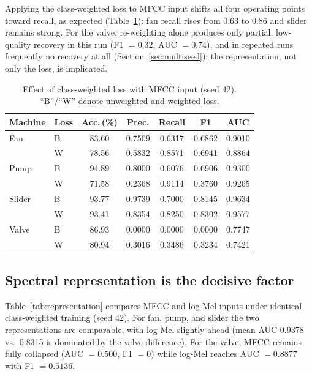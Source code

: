 \documentclass[review,nopreprintline]{elsarticle}
\begin{document}
Applying the class-weighted loss to MFCC input shifts all four operating points toward recall, as expected (Table~\ref{tab:posweight}): fan recall rises from 0.63 to 0.86 and slider remains strong. For the valve, re-weighting alone produces only partial, low-quality recovery in this run (F1 $=0.32$, AUC $=0.74$), and in repeated runs frequently no recovery at all (Section~\ref{sec:multiseed}): the representation, not only the loss, is implicated.

\begin{table}[t]
\centering
\caption{Effect of class-weighted loss with MFCC input (seed 42). ``B''/``W'' denote unweighted and weighted loss.}
\label{tab:posweight}
\setlength{\tabcolsep}{3.5pt}
\begin{tabular}{llccccc}
\toprule
Machine & Loss & Acc.\,(\%) & Prec. & Recall & F1 & AUC \\
\midrule
Fan    & B & 83.60 & 0.7509 & 0.6317 & 0.6862 & 0.9010 \\
       & W & 78.56 & 0.5832 & 0.8571 & 0.6941 & 0.8864 \\
Pump   & B & 94.89 & 0.8000 & 0.6076 & 0.6906 & 0.9300 \\
       & W & 71.58 & 0.2368 & 0.9114 & 0.3760 & 0.9265 \\
Slider & B & 93.77 & 0.9739 & 0.7000 & 0.8145 & 0.9634 \\
       & W & 93.41 & 0.8354 & 0.8250 & 0.8302 & 0.9577 \\
Valve  & B & 86.93 & 0.0000 & 0.0000 & 0.0000 & 0.7747 \\
       & W & 80.94 & 0.3016 & 0.3486 & 0.3234 & 0.7421 \\
\bottomrule
\end{tabular}
\end{table}

\subsection{Spectral representation is the decisive factor}
\label{sec:representation}

Table~\ref{tab:representation} compares MFCC and log-Mel inputs under identical class-weighted training (seed 42). For fan, pump, and slider the two representations are comparable, with log-Mel slightly ahead (mean AUC 0.9378 vs.\ 0.8315 is dominated by the valve difference). For the valve, MFCC remains fully collapsed (AUC $=0.500$, F1 $=0$) while log-Mel reaches AUC $=0.8877$ with F1 $=0.5136$.
\end{document}
